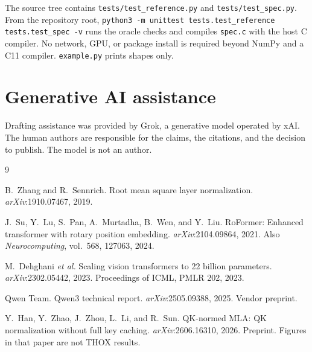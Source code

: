 \documentclass[11pt]{article}
\begin{document}
The source tree contains \texttt{tests/test\_reference.py} and \texttt{tests/test\_spec.py}. From the repository root, \texttt{python3 -m unittest tests.test\_reference tests.test\_spec -v} runs the oracle checks and compiles \texttt{spec.c} with the host C compiler. No network, GPU, or package install is required beyond NumPy and a C11 compiler. \texttt{example.py} prints shapes only.

\section*{Generative AI assistance}

Drafting assistance was provided by Grok, a generative model operated by xAI. The human authors are responsible for the claims, the citations, and the decision to publish. The model is not an author.

\begin{thebibliography}{9}

B.~Zhang and R.~Sennrich.
Root mean square layer normalization.
\textit{arXiv}:1910.07467, 2019.

J.~Su, Y.~Lu, S.~Pan, A.~Murtadha, B.~Wen, and Y.~Liu.
RoFormer: Enhanced transformer with rotary position embedding.
\textit{arXiv}:2104.09864, 2021.
Also \textit{Neurocomputing}, vol.~568, 127063, 2024.

M.~Dehghani \emph{et al.}
Scaling vision transformers to 22 billion parameters.
\textit{arXiv}:2302.05442, 2023.
Proceedings of ICML, PMLR 202, 2023.

Qwen Team.
Qwen3 technical report.
\textit{arXiv}:2505.09388, 2025.
Vendor preprint.

Y.~Han, Y.~Zhao, J.~Zhou, L.~Li, and R.~Sun.
QK-normed MLA: QK normalization without full key caching.
\textit{arXiv}:2606.16310, 2026.
Preprint. Figures in that paper are not THOX results.

\end{thebibliography}
\end{document}
